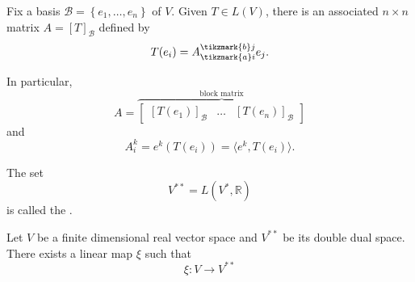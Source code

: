\documentclass[notoc,notitlepage]{tufte-book}
\begin{document}
\begin{eg}
  Fix a basis $\mathcal{B} = \left\{ e_1, \ldots, e_n \right\}$ of $V$.
  Given $T \in L(V)$,
  there is an associated $n \times n$ matrix $A = [T]_{\mathcal{B}}$ defined by
  \begin{equation*}
    T(e_i) = A_{\tikzmark{a}i}^{\tikzmark{b}j} e_j.
  \end{equation*}
  In particular,
  \begin{equation*}
    A = \overbrace{
      \begin{bmatrix}
        [ T(e_1) ]_{\mathcal{B}} & \hdots & [ T(e_n) ]_{\mathcal{B}}
      \end{bmatrix}
    }^{\text{block matrix}}
  \end{equation*}
  and
  \begin{equation*}
    A_i^k = e^k( T(e_i) ) = \langle e^k, T(e_i) \rangle.
  \end{equation*}
\end{eg}

\begin{defn}\label{defn:double_dual_space}
  The set
  \begin{equation*}
    V^{**} = L(V^*, \mathbb{R})
  \end{equation*}
  is called the .
\end{defn}

\begin{propo}\label{propo:the_space_and_its_double_dual_space}
  Let $V$ be a finite dimensional real vector space and $V^{**}$ be its double dual space. There exists a linear map $\xi$ such that
  \begin{equation*}
    \xi : V \to V^{**}
  \end{equation*}
\end{propo}
\end{document}
